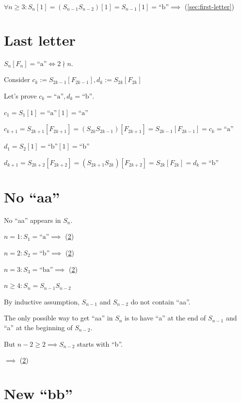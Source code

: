 \documentclass{article}
\begin{document}
\( \forall n \geq 3: S_{n}[1] = (S_{n-1}S_{n-2})[1] = S_{n-1}[1] = \text{``b''} \implies \) (\ref{sec:first-letter})

\section{Last letter}\label{sec:last-letter}

\( S_{n}[F_{n}] = \text{``a''} \iff 2 \nmid n \).

Consider \( c_{k} := S_{2k-1}[F_{2k-1}], d_{k} := S_{2k}[F_{2k}] \)

Let's prove \( c_{k} = \text{``a''}, d_{k} = \text{``b''} \).

\( c_{1} = S_{1}[1] = \text{``a''}[1] = \text{``a''} \)

\( c_{k+1} = S_{2k+1}[F_{2k+1}] = (S_{2k}S_{2k-1})[F_{2k+1}] = S_{2k-1}[F_{2k-1}] = c_{k} = \text{``a''} \)

\( d_{1} = S_{2}[1] = \text{``b''}[1] = \text{``b''} \)

\( d_{k+1} = S_{2k+2}[F_{2k+2}] = (S_{2k+1}S_{2k})[F_{2k+2}] = S_{2k}[F_{2k}] = d_{k} = \text{``b''} \)

\section{No ``aa''}\label{sec:no-aa}

No ``aa'' appears in \( S_{n} \).

\( n = 1: S_{1} = \text{``a''} \implies \) (\ref{sec:no-aa})

\( n = 2: S_{2} = \text{``b''} \implies \) (\ref{sec:no-aa})

\( n = 3: S_{3} = \text{``ba''} \implies \) (\ref{sec:no-aa})

\( n \geq 4: S_{n} = S_{n-1}S_{n-2} \)

By inductive assumption, \( S_{n-1} \) and \( S_{n-2} \) do not contain ``aa''.

The only possible way to get ``aa'' in \( S_{n} \) is to have ``a'' at the end of \( S_{n-1} \) and ``a'' at the beginning of \( S_{n-2} \).

But \( n - 2 \geq 2 \implies S_{n-2} \) starts with ``b''.

\( \implies \) (\ref{sec:no-aa})

\section{New ``bb''}\label{sec:new-bb}
\end{document}
